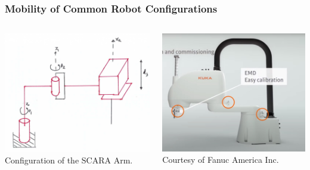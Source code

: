 %
\begin{frame}
	\frametitle{Mobility of Common Robot Configurations}
	\begin{columns}[]
		\begin{column}{.5\linewidth}
			\centering
			\includegraphics[width=\textwidth]{figures/scara_schematic.jpg}
			\footnotesize{Configuration of the SCARA Arm.}
		\end{column}
		\begin{column}{.5\linewidth}
			\centering
			\includegraphics[width=\textwidth, rotate=360]{figures/Scara.jpg}
			\footnotesize{Courtesy of Fanuc America Inc.}
		\end{column}
	\end{columns}
\end{frame}
